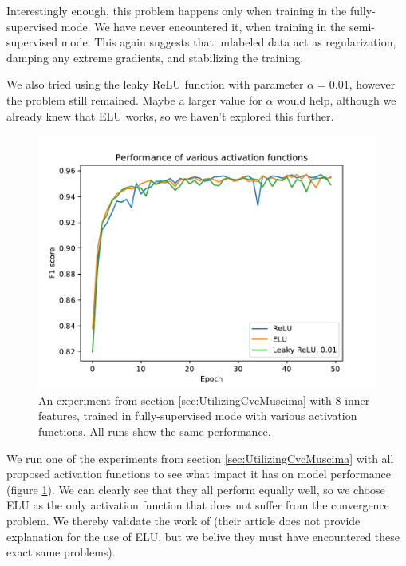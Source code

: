 Interestingly enough, this problem happens only when training in the fully-supervised mode. We have never encountered it, when training in the semi-supervised mode. This again suggests that unlabeled data act as regularization, damping any extreme gradients, and stabilizing the training.

We also tried using the leaky ReLU function with parameter $\alpha = 0.01$, however the problem still remained. Maybe a larger value for $\alpha$ would help, although we already knew that ELU works, so we haven't explored this further.

\begin{figure}[ht]
    \centering
    \includegraphics[width=140mm]{../../figures/03-activation-function/performance.pdf}
    \caption{An experiment from section \ref{sec:UtilizingCvcMuscima} with 8 inner features, trained in fully-supervised mode with various activation functions. All runs show the same performance.}
    \label{fig:ActivationFunctionPerformances}
\end{figure}

We run one of the experiments from section \ref{sec:UtilizingCvcMuscima} with all proposed activation functions to see what impact it has on model performance (figure \ref{fig:ActivationFunctionPerformances}). We can clearly see that they all perform equally well, so we choose ELU as the only activation function that does not suffer from the convergence problem. We thereby validate the work of \cite{DorferEtAl} (their article does not provide explanation for the use of ELU, but we belive they must have encountered these exact same problems).


